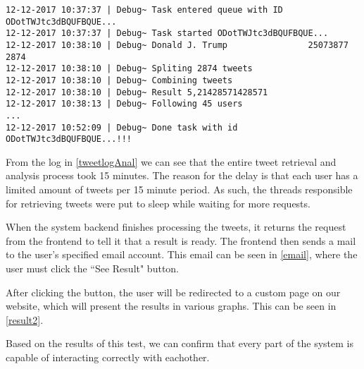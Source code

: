 
\begin{minipage}[H]{\linewidth}
\begin{lstlisting}[caption = Log from tweet retrieval and analysis, label = tweetlogAnal] 
12-12-2017 10:37:37 | Debug~ Task entered queue with ID ODotTWJtc3dBQUFBQUE...
12-12-2017 10:37:37 | Debug~ Task started ODotTWJtc3dBQUFBQUE...
12-12-2017 10:38:10 | Debug~ Donald J. Trump                25073877             2874       
12-12-2017 10:38:10 | Debug~ Spliting 2874 tweets
12-12-2017 10:38:10 | Debug~ Combining tweets
12-12-2017 10:38:10 | Debug~ Result 5,21428571428571
12-12-2017 10:38:13 | Debug~ Following 45 users
...
12-12-2017 10:52:09 | Debug~ Done task with id ODotTWJtc3dBQUFBQUE...!!!
\end{lstlisting}
\end{minipage}

From the log in \autoref{tweetlogAnal} we can see that the entire tweet
retrieval and analysis process took 15 minutes. The reason for the delay is that
each user has a limited amount of tweets per 15 minute period. As such, the
threads responsible for retrieving tweets were put to sleep while waiting for
more requests.\nl

When the system backend finishes processing the tweets, it returns the request
from the frontend to tell it that a result is ready. The frontend then sends a
mail to the user's specified email account. This email can be seen in
\autoref{email}, where the user must click the ``See Result" button.\nl


After clicking the button, the user will be redirected to a custom page on our
website, which will present the results in various graphs. This can be seen in
\autoref{result2}.\nl


Based on the results of this test, we can confirm that every part of the system
is capable of interacting correctly with eachother.






